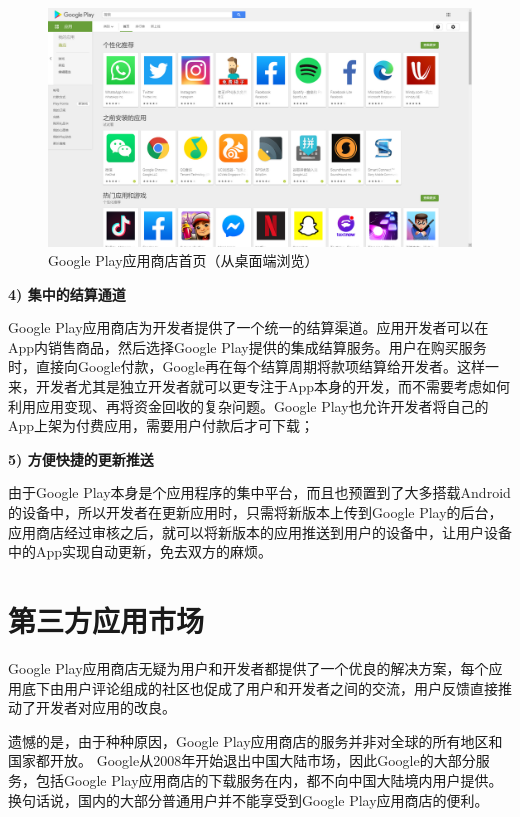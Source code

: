 \begin{figure}
	\centering
	\includegraphics[width=\textwidth]{./Figures/edwin-google-play.jpg}
	\caption{Google Play应用商店首页（从桌面端浏览）}
	\label{fig:Google-Play-Main}
\end{figure}

\textbf{4) 集中的结算通道}

Google Play应用商店为开发者提供了一个统一的结算渠道。应用开发者可以在App内销售商品，然后选择Google Play提供的集成结算服务。用户在购买服务时，直接向Google付款，Google再在每个结算周期将款项结算给开发者。这样一来，开发者尤其是独立开发者就可以更专注于App本身的开发，而不需要考虑如何利用应用变现、再将资金回收的复杂问题。Google Play也允许开发者将自己的App上架为付费应用，需要用户付款后才可下载；

\textbf{5) 方便快捷的更新推送}

由于Google Play本身是个应用程序的集中平台，而且也预置到了大多搭载Android的设备中，所以开发者在更新应用时，只需将新版本上传到Google Play的后台，应用商店经过审核之后，就可以将新版本的应用推送到用户的设备中，让用户设备中的App实现自动更新，免去双方的麻烦。

\section{第三方应用市场}

Google Play应用商店无疑为用户和开发者都提供了一个优良的解决方案，每个应用底下由用户评论组成的社区也促成了用户和开发者之间的交流，用户反馈直接推动了开发者对应用的改良。

遗憾的是，由于种种原因，Google Play应用商店的服务并非对全球的所有地区和国家都开放。
Google从2008年开始退出中国大陆市场，因此Google的大部分服务，包括Google Play应用商店的下载服务在内，都不向中国大陆境内用户提供。
换句话说，国内的大部分普通用户并不能享受到Google Play应用商店的便利。

